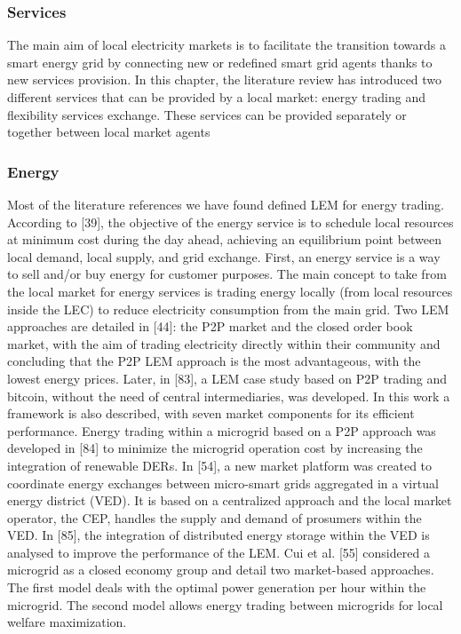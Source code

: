 \subsubsection{Services}
The main aim of local electricity markets is to facilitate the transition towards a smart energy grid by connecting new or redefined smart grid agents thanks to new services provision. In this chapter, the literature review has introduced two different services that can be provided by a local market: energy trading and flexibility services exchange. These services can be provided separately or together between local market agents 

\subsubsection{Energy}
Most of the literature references we have found defined LEM for energy trading. According to [39], the objective of the energy service is to schedule local resources at minimum cost during the day ahead, achieving an equilibrium point between local demand, local supply, and grid exchange. First, an energy service is a way to sell and/or buy energy for customer purposes. The main concept to take from the local market for energy services is trading energy locally (from local resources inside the LEC) to reduce electricity consumption from the main grid.
Two LEM approaches are detailed in [44]: the P2P market and the closed order book market, with the aim of trading electricity directly within their community and concluding that the P2P LEM approach is the most advantageous, with the lowest energy prices. Later, in [83], a LEM case study based on P2P trading and bitcoin, without the need of central intermediaries, was developed. In this work a framework is also described, with seven market components for its efficient performance. Energy trading within a microgrid based on a P2P approach was developed in [84] to minimize the microgrid operation cost by increasing the integration of renewable DERs. In [54], a new market platform was created to coordinate energy exchanges between micro-smart grids aggregated in a virtual energy district (VED). It is based on a centralized approach and the local market operator, the CEP, handles the supply and demand of prosumers within the VED. In [85], the integration of distributed energy storage within the VED is analysed to improve the performance of the LEM.
Cui et al. [55] considered a microgrid as a closed economy group and detail two market-based approaches. The first model deals with the optimal power generation per hour within the microgrid. The second model allows energy trading between microgrids for local welfare maximization.
